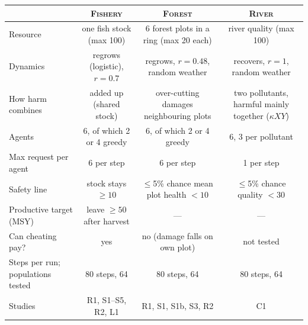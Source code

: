 \begin{tabular}{@{}lccc@{}}
\toprule
 & \textsc{Fishery} & \textsc{Forest} & \textsc{River} \\
\midrule
Resource & one fish stock (max 100) & 6 forest plots in a ring (max 20 each) & river quality (max 100) \\
Dynamics & regrows (logistic), $r=0.7$ & regrows, $r=0.48$, random weather & recovers, $r=1$, random weather \\
How harm combines & added up (shared stock) & over-cutting damages neighbouring plots & two pollutants, harmful mainly together ($\kappa XY$) \\
Agents & 6, of which 2 or 4 greedy & 6, of which 2 or 4 greedy & 6, 3 per pollutant \\
Max request per agent & 6 per step & 6 per step & 1 per step \\
Safety line & stock stays $\geq 10$ & $\leq$5\% chance mean plot health $<10$ & $\leq$5\% chance quality $<30$ \\
Productive target (MSY) & leave $\geq 50$ after harvest & --- & --- \\
Can cheating pay? & yes & no (damage falls on own plot) & not tested \\
Steps per run; populations tested & 80 steps, 64 & 80 steps, 64 & 80 steps, 64 \\
Studies & R1, S1--S5, R2, L1 & R1, S1, S1b, S3, R2 & C1 \\
\bottomrule
\end{tabular}
